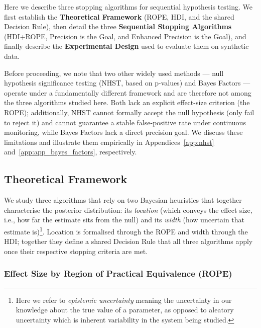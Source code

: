 Here we describe three stopping algorithms for sequential hypothesis testing.
We first establish the \textbf{Theoretical Framework} (ROPE, HDI, and the shared Decision Rule),
then detail the three \textbf{Sequential Stopping Algorithms} (HDI+ROPE, Precision is the Goal,
and Enhanced Precision is the Goal), and finally describe the \textbf{Experimental Design}
used to evaluate them on synthetic data.

Before proceeding, we note that two other widely used methods --- null hypothesis
significance testing (NHST, based on p-values) and Bayes Factors --- operate under
a fundamentally different framework and are therefore not among the three algorithms
studied here. Both lack an explicit effect-size criterion (the ROPE); additionally,
NHST cannot formally accept the null hypothesis (only fail to reject it) and cannot
guarantee a stable false-positive rate under continuous monitoring, while Bayes Factors
lack a direct precision goal.
We discuss these limitations and illustrate them empirically in
Appendices~\ref{app:nhst} and~\ref{app:app_bayes_factors}, respectively.

\subsection{Theoretical Framework}\label{sec:theoretical_framework}

We study three algorithms that rely on two Bayesian heuristics that together characterise the
posterior distribution: its \textit{location} (which conveys the effect size, i.e., how far the estimate sits from the null)
and its \textit{width} (how uncertain that estimate is)\footnote{Here we refer to \textit{epistemic uncertainty} meaning the uncertainty in our knowledge about the true value of a parameter, as opposed to aleatory uncertainty which is inherent variability in the system being studied.}. Location is formalised through
the ROPE and width through the HDI; together they define a shared Decision Rule that
all three algorithms apply once their respective stopping criteria are met.

\subsubsection{Effect Size by Region of Practical Equivalence (ROPE)}\label{sec:rope}

